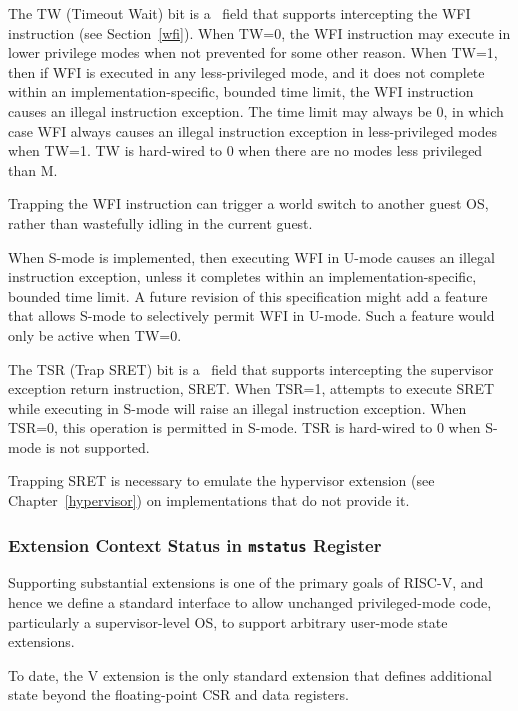 The TW (Timeout Wait) bit is a \warl\ field that supports intercepting the WFI
instruction (see Section~\ref{wfi}).
When TW=0, the WFI instruction may execute in lower
privilege modes when not prevented for some other reason.  When TW=1,
then if WFI is executed in any less-privileged mode, and it does not complete
within an implementation-specific, bounded time limit, the WFI instruction
causes an illegal instruction exception.  The time limit may always be 0, in which
case WFI always causes an illegal instruction exception in less-privileged modes
when TW=1.  TW is hard-wired to 0 when there are no modes less privileged than
M.

\begin{commentary}
Trapping the WFI
instruction can trigger a world switch to another guest OS, rather than
wastefully idling in the current guest.
\end{commentary}

When S-mode is implemented, then executing WFI in U-mode causes an illegal
instruction exception, unless it completes within an implementation-specific,
bounded time limit.  A future revision of this specification might add
a feature that allows S-mode to selectively permit WFI in U-mode.  Such
a feature would only be active when TW=0.

The TSR (Trap SRET) bit is a \warl\ field that
supports intercepting the supervisor exception return
instruction, SRET.  When TSR=1, attempts to execute SRET while executing in
S-mode will raise an illegal instruction exception.  When TSR=0, this
operation is permitted in S-mode.  TSR is hard-wired to 0 when S-mode is not
supported.

\begin{commentary}
Trapping SRET is necessary to emulate the hypervisor extension
(see Chapter~\ref{hypervisor}) on implementations that do not provide it.
\end{commentary}

\subsubsection{Extension Context Status in {\tt mstatus} Register}

Supporting substantial extensions is one of the primary goals of
RISC-V, and hence we define a standard interface to allow unchanged
privileged-mode code, particularly a supervisor-level OS, to support
arbitrary user-mode state extensions.

\begin{commentary}
  To date, the V extension is the only standard extension that defines
  additional state beyond the floating-point CSR and data registers.
\end{commentary}

